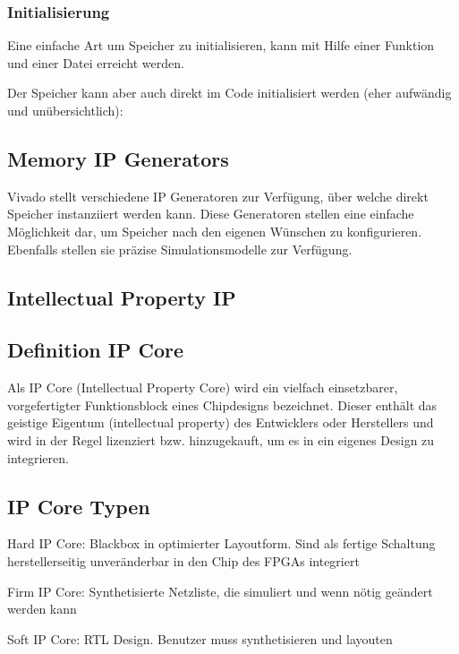 \subsubsection{Initialisierung}
Eine einfache Art um Speicher zu initialisieren, kann mit Hilfe einer Funktion und einer Datei erreicht werden.


Der Speicher kann aber auch direkt im Code initialisiert werden (eher aufwändig und unübersichtlich):


\subsection{Memory IP Generators}
Vivado stellt verschiedene IP Generatoren zur Verfügung, über welche direkt Speicher instanziiert werden kann. Diese Generatoren stellen eine einfache Möglichkeit dar, um Speicher nach den eigenen Wünschen zu konfigurieren. Ebenfalls stellen sie präzise Simulationsmodelle zur Verfügung.

\subsection{Intellectual Property IP}
\begin{multicols}{2}
\subsection{Definition IP Core}
Als IP Core (Intellectual Property Core) wird ein vielfach einsetzbarer, vorgefertigter Funktionsblock eines Chipdesigns bezeichnet. Dieser enthält das geistige Eigentum (intellectual property) des Entwicklers oder Herstellers und wird in der Regel lizenziert bzw. hinzugekauft, um es in ein eigenes Design zu integrieren.

\vfill\null
\columnbreak

\subsection{IP Core Typen}
\begin{compactitem}
    \item Hard IP Core: Blackbox in optimierter Layoutform. Sind als fertige Schaltung herstellerseitig unveränderbar in den Chip des FPGAs integriert
    \item Firm IP Core: Synthetisierte Netzliste, die simuliert und wenn nötig geändert werden kann
    \item Soft IP Core: RTL Design. Benutzer muss synthetisieren und layouten
\end{compactitem}
\end{multicols}

